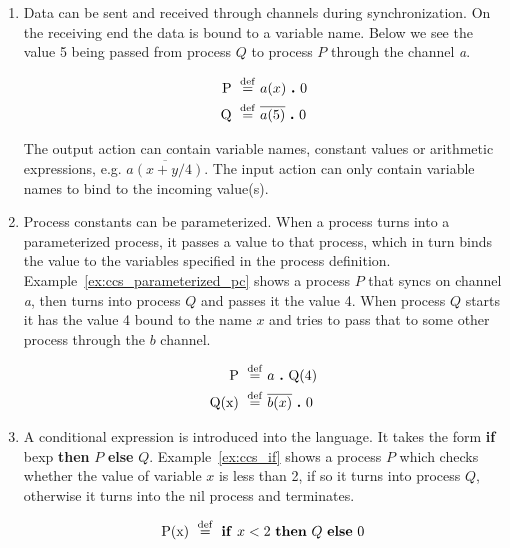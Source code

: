 	\begin{enumerate}
		\item Data can be sent and received through channels during 
		synchronization. On the receiving end the data is bound to a variable 
		name. Below we see the value 5 being passed from process $Q$ to process 
		$P$ through the channel \textit{a}.

		\begin{Exa}
			\begin{align*}
				\mathrm{P} \ \stackrel{\mathrm{def}}{=}\  & a(x) \ \textbf{.}\  0 \\
				\mathrm{Q} \ \stackrel{\mathrm{def}}{=}\  & \overline{a(5)} \ \textbf{.}\  0 
			\end{align*}	
		\end{Exa}
		
	 	The output action can contain variable names, constant values or  
	 	arithmetic expressions, e.g. $\overline{a(x+y/4)}$. The input action can 
	 	only contain variable names to bind to the incoming value(s).
		
		\item Process constants can be parameterized. When a process turns into a 
		parameterized process, it passes a value to that process, which in turn 
		binds the value to the variables specified in the process definition. 
		Example~\ref{ex:ccs_parameterized_pc} shows a process $P$ that syncs on 
		channel \textit{a}, then turns into process $Q$ and passes it the value 4. 
		When process $Q$ starts it has the value 4 bound to the name $x$ and tries 
		to pass that to some other process through the $b$ channel.

		\begin{Exa}
			\label{ex:ccs_parameterized_pc}
			\begin{align*}
				\mathrm{P} \ \stackrel{\mathrm{def}}{=}\  & a \ \textbf{.}\  \mathrm{Q(4)} \\
				\mathrm{Q(x)} \ \stackrel{\mathrm{def}}{=}\  & \overline{b(x)} \ \textbf{.}\  0 
			\end{align*}	
		\end{Exa}
		
		\item A conditional expression is introduced into the language. It takes 
		the form \textbf{if} bexp \textbf{then} $P$ \textbf{else} $Q$. 
		Example~\ref{ex:ccs_if} shows a process $P$ which checks whether the value 
		of variable $x$ is less than 2, if so it turns into process $Q$, otherwise 
		it turns into the nil process and terminates.

		\begin{Exa}
			\label{ex:ccs_if}
			\begin{align*}
				\mathrm{P(x)} \defeq \mathbf{if}\ x < 2\ \mathbf{then}\ Q\  \mathbf{else}\ 0 
			\end{align*}	
		\end{Exa}
	\end{enumerate}
	
